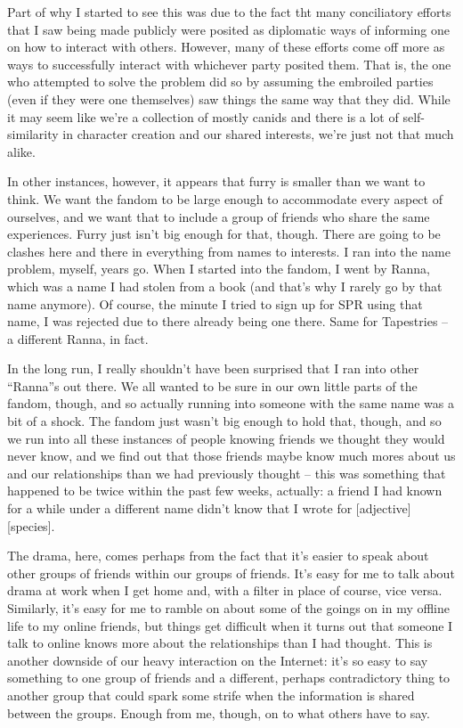 Part of why I started to see this was due to the fact tht many conciliatory efforts that I saw being made publicly were posited as diplomatic ways of informing one on how to interact with others. However, many of these efforts come off more as ways to successfully interact with whichever party posited them. That is, the one who attempted to solve the problem did so by assuming the embroiled parties (even if they were one themselves) saw things the same way that they did. While it may seem like we're a collection of mostly canids and there is a lot of self-similarity in character creation and our shared interests, we're just not that much alike.

In other instances, however, it appears that furry is smaller than we want to think. We want the fandom to be large enough to accommodate every aspect of ourselves, and we want that to include a group of friends who share the same experiences. Furry just isn't big enough for that, though. There are going to be clashes here and there in everything from names to interests. I ran into the name problem, myself, years go. When I started into the fandom, I went by Ranna, which was a name I had stolen from a book (and that's why I rarely go by that name anymore). Of course, the minute I tried to sign up for SPR using that name, I was rejected due to there already being one there.  Same for Tapestries -- a different Ranna, in fact.

In the long run, I really shouldn't have been surprised that I ran into other “Ranna”s out there. We all wanted to be sure in our own little parts of the fandom, though, and so actually running into someone with the same name was a bit of a shock. The fandom just wasn't big enough to hold that, though, and so we run into all these instances of people knowing friends we thought they would never know, and we find out that those friends maybe know much mores about us and our relationships than we had previously thought -- this was something that happened to be twice within the past few weeks, actually: a friend I had known for a while under a different name didn't know that I wrote for [adjective][species].

The drama, here, comes perhaps from the fact that it's easier to speak about other groups of friends within our groups of friends. It's easy for me to talk about drama at work when I get home and, with a filter in place of course, vice versa. Similarly, it's easy for me to ramble on about some of the goings on in my offline life to my online friends, but things get difficult when it turns out that someone I talk to online knows more about the relationships than I had thought. This is another downside of our heavy interaction on the Internet: it's so easy to say something to one group of friends and a different, perhaps contradictory thing to another group that could spark some strife when the information is shared between the groups.  Enough from me, though, on to what others have to say.

